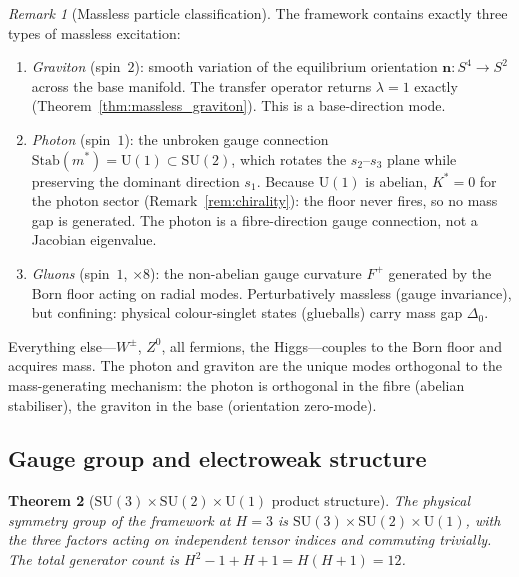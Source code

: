 \documentclass[11pt,a4paper]{article}
\newtheorem{theorem}{Theorem}[section]
\theoremstyle{definition}
\theoremstyle{remark}
\newtheorem{remark}[theorem]{Remark}
\newcommand{\SU}{\mathrm{SU}}
\begin{document}
\begin{remark}[Massless particle classification]\label{rem:massless_classification}
The framework contains exactly three types of massless excitation:
\begin{enumerate}[nosep]
\item \emph{Graviton} (spin~$2$): smooth variation of the equilibrium orientation $\mathbf{n}:S^4\to S^2$ across the base manifold. The transfer operator returns $\lambda=1$ exactly (Theorem~\ref{thm:massless_graviton}). This is a base-direction mode.
\item \emph{Photon} (spin~$1$): the unbroken gauge connection $\mathrm{Stab}(m^*)=\mathrm{U}(1)\subset\SU(2)$, which rotates the $s_2$--$s_3$ plane while preserving the dominant direction $s_1$. Because $\mathrm{U}(1)$ is abelian, $K^*=0$ for the photon sector (Remark~\ref{rem:chirality}): the floor never fires, so no mass gap is generated. The photon is a fibre-direction gauge connection, not a Jacobian eigenvalue.
\item \emph{Gluons} (spin~$1$, $\times 8$): the non-abelian gauge curvature $F^+$ generated by the Born floor acting on radial modes. Perturbatively massless (gauge invariance), but confining: physical colour-singlet states (glueballs) carry mass gap $\Delta_0$.
\end{enumerate}
Everything else---$W^\pm$, $Z^0$, all fermions, the Higgs---couples to the Born floor and acquires mass. The photon and graviton are the unique modes orthogonal to the mass-generating mechanism: the photon is orthogonal in the fibre (abelian stabiliser), the graviton in the base (orientation zero-mode).
\end{remark}

\subsection{Gauge group and electroweak structure}\label{sec:gauge_structure}

\begin{theorem}[$\SU(3)\times\SU(2)\times\mathrm{U}(1)$ product structure]\label{thm:gauge_product}
The physical symmetry group of the framework at $H=3$ is $\SU(3)\times\SU(2)\times\mathrm{U}(1)$, with the three factors acting on independent tensor indices and commuting trivially. The total generator count is $H^2-1+H+1=H(H+1)=12$.
\end{theorem}
\end{document}
